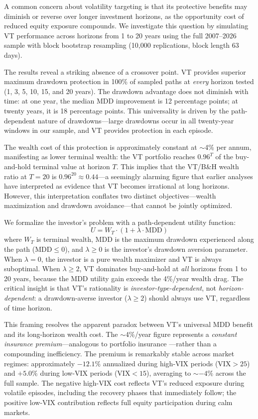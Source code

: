 A common concern about volatility targeting is that its protective benefits may diminish or reverse over longer investment horizons, as the opportunity cost of reduced equity exposure compounds. We investigate this question by simulating VT performance across horizons from 1 to 20 years using the full 2007--2026 sample with block bootstrap resampling (10{,}000 replications, block length 63 days).

The results reveal a striking absence of a crossover point. VT provides superior maximum drawdown protection in 100\% of sampled paths at \textit{every} horizon tested (1, 3, 5, 10, 15, and 20 years). The drawdown advantage does not diminish with time: at one year, the median MDD improvement is 12 percentage points; at twenty years, it is 18 percentage points. This universality is driven by the path-dependent nature of drawdowns---large drawdowns occur in all twenty-year windows in our sample, and VT provides protection in each episode.

The wealth cost of this protection is approximately constant at $\sim$4\% per annum, manifesting as lower terminal wealth: the VT portfolio reaches $0.96^T$ of the buy-and-hold terminal value at horizon $T$. This implies that the VT/B\&H wealth ratio at $T = 20$ is $0.96^{20} \approx 0.44$---a seemingly alarming figure that earlier analyses have interpreted as evidence that VT becomes irrational at long horizons. However, this interpretation conflates two distinct objectives---wealth maximization and drawdown avoidance---that cannot be jointly optimized.

We formalize the investor's problem with a path-dependent utility function:
\begin{equation}
U = W_T \cdot (1 + \lambda \cdot \text{MDD})
\label{eq:mdd_utility}
\end{equation}
where $W_T$ is terminal wealth, MDD is the maximum drawdown experienced along the path ($\text{MDD} \leq 0$), and $\lambda \geq 0$ is the investor's drawdown aversion parameter. When $\lambda = 0$, the investor is a pure wealth maximizer and VT is always suboptimal. When $\lambda \geq 2$, VT dominates buy-and-hold at \textit{all} horizons from 1 to 20 years, because the MDD utility gain exceeds the 4\%/year wealth drag. The critical insight is that VT's rationality is \textit{investor-type-dependent}, not \textit{horizon-dependent}: a drawdown-averse investor ($\lambda \geq 2$) should always use VT, regardless of time horizon.

This framing resolves the apparent paradox between VT's universal MDD benefit and its long-horizon wealth cost. The $\sim$4\%/year figure represents a \textit{constant insurance premium}---analogous to portfolio insurance \citep{moreira2017}---rather than a compounding inefficiency. The premium is remarkably stable across market regimes: approximately $-12.1\%$ annualized during high-VIX periods ($\text{VIX} > 25$) and $+5.0\%$ during low-VIX periods ($\text{VIX} < 15$), averaging to $\sim$$-4\%$ across the full sample. The negative high-VIX cost reflects VT's reduced exposure during volatile episodes, including the recovery phases that immediately follow; the positive low-VIX contribution reflects full equity participation during calm markets.

